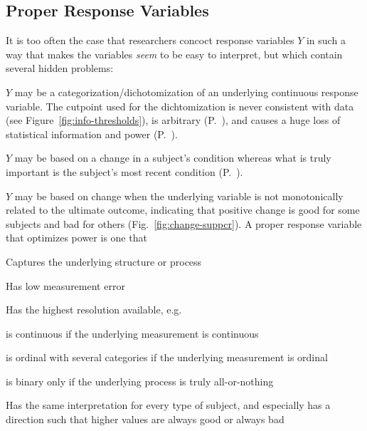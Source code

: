\subsection{Proper Response Variables}
It is too often the case that researchers concoct response variables $Y$
in such a way that makes the variables \emph{seem} to be easy to
interpret, but which contain several hidden problems:
\bi
\item $Y$ may be a categorization/dichotomization of an underlying
  continuous response variable.  The cutpoint used for the
  dichtomization is never consistent with data (see
  Figure~\ref{fig:info-thresholds}), 
  is arbitrary (P.~\pageref{pg:info-gia14opt}), and causes a huge loss of
  statistical information and power (P.~\pageref{pg:info-fed09con}).
\item $Y$ may be based on a change in a subject's condition whereas
  what is truly important is the subject's most recent condition
  (P.~\pageref{pg:change-anova}).
\item $Y$ may be based on change when the underlying variable is not
  monotonically related to the ultimate outcome, indicating that
  positive change is good for some subjects and bad for others
  (Fig.~\ref{fig:change-suppcr}).
\ei
A proper response variable that optimizes power is one that
\bi
\item Captures the underlying structure or process
\item Has low measurement error
\item Has the highest resolution available, e.g.
 \bi
 \item is continuous if the underlying measurement is continuous
 \item is ordinal with several categories if the underlying
   measurement is ordinal
 \item is binary only if the underlying process is truly
   all-or-nothing
 \ei
\item Has the same interpretation for every type of subject, and
  especially has a direction such that higher values are always good
  or always bad
\ei

